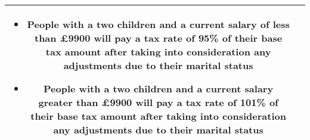 \begin{table}[H]
\begin{tabularx}{\textwidth}{| c | X |}
\begin{itemize}[itemsep=\tableitemsep, leftmargin=\tableleftsep]
        \item People with a two children and a current salary of less than £9900 will pay a tax rate of 95\% of their base tax amount after taking into consideration any adjustments due to their marital status
        \item People with a two children and a current salary greater than £9900 will pay a tax rate of 101\% of their base tax amount after taking into consideration any adjustments due to their marital status
    \end{itemize}
    \\
    \hline %
\end{tabularx}
\end{table}

